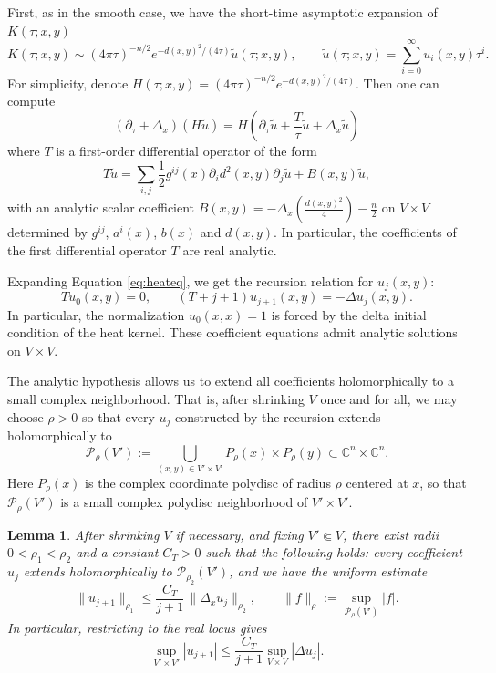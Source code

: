 \documentclass[11pt]{amsart}
\theoremstyle{plain}
\newtheorem{lem}[thm]{Lemma}
\theoremstyle{definition}
\newcommand{\C}{\mathbb{C}}
\begin{document}
First, as in the smooth case, we have the short-time asymptotic expansion of $K(\tau;x,y)$ 
\[K(\tau;x,y)\sim (4\pi\tau)^{-n/2}e^{-d(x,y)^2/(4\tau)}\widetilde{u}(\tau;x,y),\qquad \widetilde{u}(\tau;x,y)=\sum_{i=0}^{\infty}u_i(x,y)\tau^i.\]
For simplicity, denote $H(\tau;x,y)=(4\pi \tau)^{-n/2}e^{-d(x,y)^2/(4\tau)}$. Then one can compute
\begin{equation}\label{eq:heateq}
(\partial_\tau+\Delta_x)(H\widetilde{u})=H\left(\partial_\tau \widetilde{u}+\frac{T}{\tau}\widetilde{u}+\Delta_x \widetilde{u}\right)
\end{equation}
where $T$ is a first-order differential operator of the form
\[
T\widetilde{u}=
\sum_{i,j}\frac12 g^{ij}(x)\partial_i d^2(x,y)\partial_j\widetilde{u}
+B(x,y)\widetilde{u},
\]
with an analytic scalar coefficient $B(x,y)=-\Delta_x\left(\frac{d(x,y)^2}{4}\right)-\frac n2$ on $V\times V$ determined by $g^{ij}$, $a^i(x)$, $b(x)$ and $d(x,y)$. In particular, the coefficients of the first differential operator $T$ are real analytic.

Expanding Equation \eqref{eq:heateq}, we get the recursion relation for $u_j(x,y)$:
\[
Tu_0(x,y)=0,\qquad (T+j+1)u_{j+1}(x,y)=-\Delta u_j(x,y).   
\]
In particular, the normalization $u_0(x,x)=1$ is forced by the delta initial condition of the heat kernel. These coefficient equations admit analytic solutions on $V\times V$.

\smallskip

The analytic hypothesis allows us to extend all coefficients holomorphically to a small complex neighborhood. That is, after shrinking $V$ once and for all, we may choose $\rho>0$ so that every $u_j$ constructed by the recursion extends holomorphically to
\[
\mathcal P_{\rho}(V'):=\bigcup_{(x,y)\in V'\times V'}P_{\rho}(x)\times P_{\rho}(y)\subset\C^n\times\C^n.
\]
Here $P_\rho(x)$ is the complex coordinate polydisc of radius $\rho$ centered at $x$, so that $\mathcal P_\rho(V')$ is a small complex polydisc neighborhood of $V'\times V'$.

\begin{lem}\label{lem:recursionestimate}
After shrinking $V$ if necessary, and fixing $V'\Subset V$, there exist radii $0<\rho_1<\rho_2$ and a constant $C_T>0$ such that the following holds: every coefficient $u_j$ extends holomorphically to $\mathcal P_{\rho_2}(V')$, and we have the uniform estimate
\begin{equation}\label{eq:Tbound-polydisc}
\|u_{j+1}\|_{\rho_1}
\le \frac{C_T}{j+1}\,\|\Delta_x u_j\|_{\rho_2},
\qquad
\|f\|_{\rho}:=\sup_{\mathcal P_{\rho}(V')}|f|.
\end{equation}
In particular, restricting to the real locus gives
\[
\sup_{V'\times V'}|u_{j+1}|
\le \frac{C_T}{j+1}\sup_{V\times V}|\Delta u_j|.
\]
\end{lem}
\end{document}
